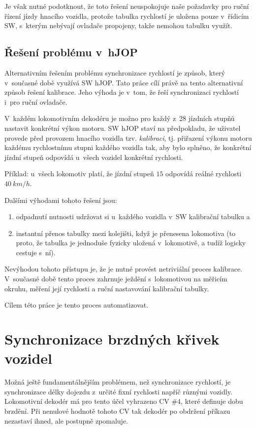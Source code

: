Je však nutné podotknout, že toto řešení neuspokojuje naše požadavky pro
ruční řízení jízdy hnacího vozidla, protože tabulka rychlostí je uložena
pouze v~řídicím SW, s~kterým nebývají ovladače propojeny, takže nemohou tabulku
využít.

\subsection{Řešení problému v~hJOP}

Alternativním řešením problému synchronizace rychlostí je způsob, který
v~současné době využívá SW hJOP. Tato práce cílí právě na tento alternativní
způsob řešení kalibrace. Jeho výhoda je v~tom, že řeší synchronizaci
rychlostí i~pro ruční ovladače.

V~každém lokomotivním dekodéru je možno pro každý z~28 jízdních stupňů nastavit
konkrétní výkon motoru. SW hJOP staví na předpokladu, že uživatel provede před
provozem hnacího vozidla tzv. \textit{kalibraci}, tj. přiřazení výkonu motoru
každému rychlostnímu stupni každého vozidla tak, aby bylo splněno, že konkrétní
jízdní stupeň odpovídá u~všech vozidel konkrétní rychlosti.

Příklad: u~všech lokomotiv platí, že jízdní stupeň $15$ odpovídá reálné
rychlosti $40\ km/h$.

Dalšími výhodami tohoto řešení jsou:

\begin{enumerate}
	\item odpadnutí nutnosti udržovat si u~každého vozidla v~SW kalibrační
	tabulku a
	\item instantní přenos tabulky mezi kolejišti, když je přenesena
	lokomotiva (to proto, že tabulka je jednoduše fyzicky uložená v~lokomotivě,
	a tudíž logicky cestuje s~ní).
\end{enumerate}

Nevýhodou tohoto přístupu je, že je nutné provést netriviální proces kalibrace.
V~současné době tento proces zahrnuje ježdění s~lokomotivou na měřicím okruhu,
měření její rychlosti a ruční nastavování kalibrační tabulky.

Cílem této práce je tento proces automatizovat.

\section{Synchronizace brzdných křivek vozidel}

Možná ještě fundamentálnějším problémem, než synchronizace rychlostí, je
synchronizace délky dojezdu z~určité fixní rychlosti napříč různými vozidly.
Lokomotivní dekodér má pro tento účel vyhrazeno CV $\#4$, které definuje
dobu brzdění. Při nenulové hodnotě tohoto CV tak dekodér po obdržení příkazu
 nezastaví ihned, ale postupně zpomaluje.

